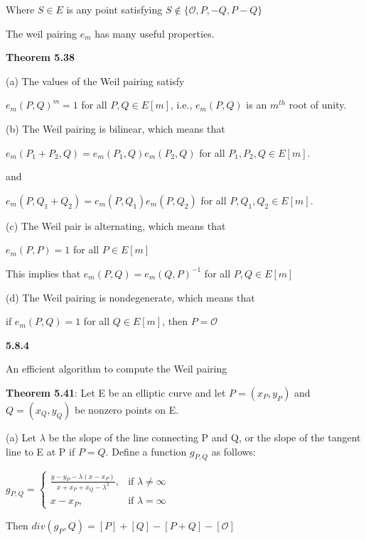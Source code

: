 \documentclass[titlepage]{article}
\begin{document}
Where $S \in E$ is any point satisfying $S \notin \{\mathcal{O}, P, -Q, P-Q\}$ 

The weil pairing $e_m$ has many useful properties. 

\vspace{5mm}

\textbf{Theorem 5.38} 

(a) The values of the Weil pairing satisfy 

\begin{center}
$e_m(P,Q)^m = 1$ for all $P,Q \in E[m]$, i.e., $e_m(P,Q)$ is an $m^{th}$ root of unity.
\end{center}  

(b) The Weil pairing is bilinear, which means that 

\begin{center} 
$e_m(P_1+P_2,Q) = e_m(P_1,Q)e_m(P_2,Q)$ for all $P_1,P_2,Q \in E[m]$.

and 

$e_m(P,Q_1+Q_2)=e_m(P,Q_1)e_m(P,Q_2)$ for all $P,Q_1,Q_2 \in E[m]$.
\end{center} 

(c) The Weil pair is alternating, which means that 

\begin{center} 
$e_m(P,P) = 1$ for all $P \in E[m]$
\end{center} 
This implies that $e_m(P,Q) = e_m(Q,P)^{-1}$ for all $P,Q \in E[m]$

(d) The Weil pairing is nondegenerate, which means that 

\begin{center} 
if $e_m(P,Q)=1$ for all $Q \in E[m]$, then $P=\mathcal{O}$
\end{center} 



\textbf{5.8.4} 

An efficient algorithm to compute the Weil pairing

\textbf{Theorem 5.41}: Let E be an elliptic curve and let $P = (x_P ,y_P)$ and $Q = (x_Q,y_Q)$ be nonzero points on E.

(a) Let $\lambda$ be the slope of the line connecting P and Q, or the slope of the tangent line to E at P if $P=Q$. Define a function $g_{P,Q} $ as follows: 

\begin{center} 
$g_{P,Q} = \begin{cases} \frac{y-y_P - \lambda(x-x_P)}{x+x_P+x_Q-\lambda^2}, & \mbox{if } \lambda \neq \infty \\ x-x_P, & \mbox{if } \lambda = \infty \end{cases}$

Then $div(g_P,Q) = [P] + [Q] - [P+Q] - [\mathcal{O}]$ 

\end{center} 
\end{document}
